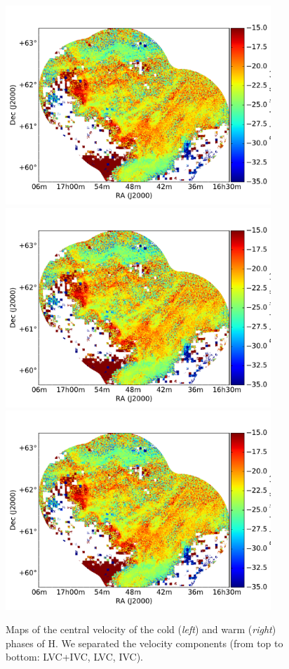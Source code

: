 \documentclass[traditabstract]{aa}
\begin{document}
\begin{figure}[h]
  \hspace{3mm}
  \includegraphics[page=5,height=7.5cm,trim=45 5 65 35,clip=true]{Figures/DHIGLS_velo.pdf} \\
  \vspace{3mm}
  \includegraphics[page=3,height=7.5cm,trim=45 5 65 35,clip=true]{Figures/DHIGLS_velo.pdf}
  \hspace{3mm}
  \includegraphics[page=6,height=7.5cm,trim=45 5 65 35,clip=true]{Figures/DHIGLS_velo.pdf}
  \caption{Maps of the central velocity of the cold (\emph{left}) and warm (\emph{right}) phases of H. We separated the velocity components (from top to bottom: LVC+IVC, LVC, IVC).}
\end{figure}
\end{document}

